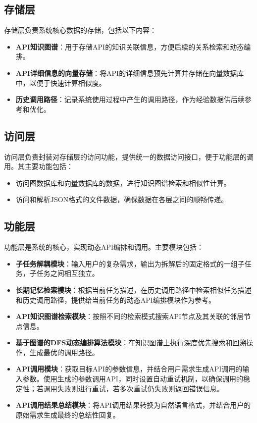 \subsection{存储层}

存储层负责系统核心数据的存储，包括以下内容：
\begin{itemize}
    \item \textbf{API知识图谱}：用于存储API的知识关联信息，方便后续的关系检索和动态编排。
    \item \textbf{API详细信息的向量存储}：将API的详细信息预先计算并存储在向量数据库中，以便于快速计算相似度。
    \item \textbf{历史调用路径}：记录系统使用过程中产生的调用路径，作为经验数据供后续参考和优化。
\end{itemize}

\subsection{访问层}

访问层负责封装对存储层的访问功能，提供统一的数据访问接口，便于功能层的调用。其主要功能包括：
\begin{itemize}
    \item 访问图数据库和向量数据库的数据，进行知识图谱检索和相似性计算。
    \item 访问和解析JSON格式的文件数据，确保数据在各层之间的顺畅传递。
\end{itemize}

\subsection{功能层}

功能层是系统的核心，实现动态API编排和调用。主要模块包括：

\begin{itemize}
  \item \textbf{子任务解耦模块}：输入用户的复杂需求，输出为拆解后的固定格式的一组子任务，子任务之间相互独立。
  \item \textbf{长期记忆检索模块}：根据当前任务描述，在历史调用路径中检索相似任务描述和历史调用路径，提供给当前任务的动态API编排模块作为参考。
  \item \textbf{API知识图谱检索模块}：按照不同的检索模式搜索API节点及其关联的邻居节点信息。
  \item \textbf{基于图谱的DFS动态编排算法模块}：在知识图谱上执行深度优先搜索和回溯操作，生成最优的调用路径。
  \item \textbf{API调用模块}：获取目标API的参数信息，并结合用户需求生成API调用的输入参数。使用生成的参数调用API，同时设置自动重试机制，以确保调用的稳定性；若调用失败则进行重试，若多次重试仍失败则返回错误信息。
  \item \textbf{API调用结果总结模块}：将API调用结果转换为自然语言格式，并结合用户的原始需求生成最终的总结性回复。
\end{itemize}

